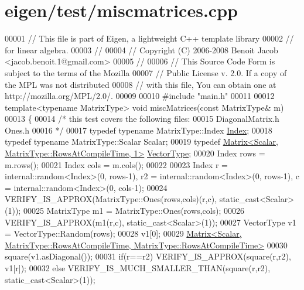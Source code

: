 \hypertarget{eigen_2test_2miscmatrices_8cpp_source}{}\section{eigen/test/miscmatrices.cpp}
\label{eigen_2test_2miscmatrices_8cpp_source}

\begin{DoxyCode}
00001 \textcolor{comment}{// This file is part of Eigen, a lightweight C++ template library}
00002 \textcolor{comment}{// for linear algebra.}
00003 \textcolor{comment}{//}
00004 \textcolor{comment}{// Copyright (C) 2006-2008 Benoit Jacob <jacob.benoit.1@gmail.com>}
00005 \textcolor{comment}{//}
00006 \textcolor{comment}{// This Source Code Form is subject to the terms of the Mozilla}
00007 \textcolor{comment}{// Public License v. 2.0. If a copy of the MPL was not distributed}
00008 \textcolor{comment}{// with this file, You can obtain one at http://mozilla.org/MPL/2.0/.}
00009 
00010 \textcolor{preprocessor}{#include "main.h"}
00011 
00012 \textcolor{keyword}{template}<\textcolor{keyword}{typename} MatrixType> \textcolor{keywordtype}{void} miscMatrices(\textcolor{keyword}{const} MatrixType& m)
00013 \{
00014   \textcolor{comment}{/* this test covers the following files:}
00015 \textcolor{comment}{     DiagonalMatrix.h Ones.h}
00016 \textcolor{comment}{  */}
00017   \textcolor{keyword}{typedef} \textcolor{keyword}{typename} MatrixType::Index \hyperlink{namespace_eigen_a62e77e0933482dafde8fe197d9a2cfde}{Index};
00018   \textcolor{keyword}{typedef} \textcolor{keyword}{typename} MatrixType::Scalar Scalar;
00019   \textcolor{keyword}{typedef} \hyperlink{group___core___module_class_eigen_1_1_matrix}{Matrix<Scalar, MatrixType::RowsAtCompileTime, 1>} 
      \hyperlink{struct_vector_type}{VectorType};
00020   Index rows = m.rows();
00021   Index cols = m.cols();
00022 
00023   Index r = internal::random<Index>(0, rows-1), r2 = internal::random<Index>(0, rows-1), c = 
      internal::random<Index>(0, cols-1);
00024   VERIFY\_IS\_APPROX(MatrixType::Ones(rows,cols)(r,c), static\_cast<Scalar>(1));
00025   MatrixType m1 = MatrixType::Ones(rows,cols);
00026   VERIFY\_IS\_APPROX(m1(r,c), static\_cast<Scalar>(1));
00027   VectorType v1 = VectorType::Random(rows);
00028   v1[0];
00029   \hyperlink{group___core___module_class_eigen_1_1_matrix}{Matrix<Scalar, MatrixType::RowsAtCompileTime, MatrixType::RowsAtCompileTime>}
00030   square(v1.asDiagonal());
00031   \textcolor{keywordflow}{if}(r==r2) VERIFY\_IS\_APPROX(square(r,r2), v1[r]);
00032   \textcolor{keywordflow}{else} VERIFY\_IS\_MUCH\_SMALLER\_THAN(square(r,r2), static\_cast<Scalar>(1));

\end{DoxyCode}
